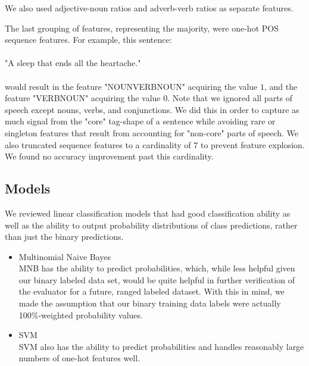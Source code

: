 \documentclass[letterpaper, 10 pt, conference]{ieeeconf}  %
\begin{document}
We also used adjective-noun ratios and adverb-verb ratios as separate features.

The last grouping of features, representing the majority, were one-hot POS sequence features. For example, this sentence: 
\\
\\
"A sleep that ends all the heartache."
\\
\\
would result in the feature "NOUN\textunderscore VERB\textunderscore NOUN" acquiring the value $1$, and the feature "VERB\textunderscore NOUN" acquiring the value $0$. Note that we ignored all parts of speech except nouns, verbs, and conjunctions. We did this in order to capture as much signal from the "core" tag-shape of a sentence while avoiding rare or singleton features that result from accounting for "non-core" parts of speech. We also truncated sequence features to a cardinality of 7 to prevent feature explosion. We found no accuracy improvement past this cardinality.


\subsection{Models}
We reviewed linear classification models that had good classification ability as well as the ability to output probability distributions of class predictions, rather than just the binary predictions.

    \begin{itemize}
      \item{Multinomial Naive Bayes} \\
      MNB has the ability to predict probabilities, which, while less helpful given our binary labeled data set, would be quite helpful in further verification of the evaluator for a future, ranged labeled dataset. With this in mind, we made the assumption that our binary training data labels were actually 100\%-weighted probability values. 
      \item{SVM}\\
      SVM also has the ability to predict probabilities and handles reasonably large numbers of one-hot features well.
    \end{itemize}
 
\end{document}
